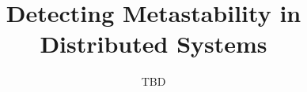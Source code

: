 \documentclass[sigplan,screen,10pt]{acmart}
\begin{document}
\title{Detecting Metastability in Distributed Systems}

\author{TBD}



\maketitle
\pagestyle{plain}











% 



\end{document}
